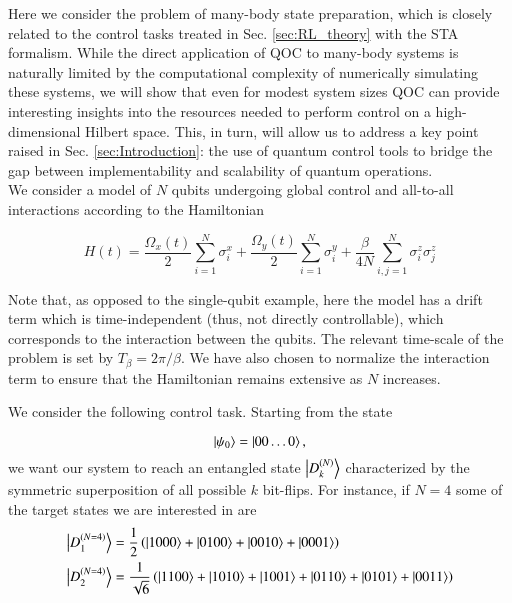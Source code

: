 Here we consider the problem of many-body state preparation, which is closely related to the control tasks treated in Sec. \ref{sec:RL_theory} with the STA formalism. While the direct application of QOC to many-body systems is naturally limited by the computational complexity of numerically simulating these systems, we will show that even for modest system sizes QOC can provide interesting insights into the resources needed to perform control on a high-dimensional Hilbert space. This, in turn, will allow us to address a key point raised in Sec. \ref{sec:Introduction}: the use of quantum control tools to bridge the gap between implementability and scalability of quantum operations. \\

We consider a model of $N$ qubits undergoing global control and all-to-all interactions according to the Hamiltonian

\begin{equation}
    H(t) = \frac{\Omega_x(t)}{2}\sum\limits_{i=1}^N \sigma_i^x + \frac{\Omega_y(t)}{2}\sum\limits_{i=1}^N \sigma_i^y + \frac{\beta}{4N}\sum\limits_{i,j=1}^N \sigma_i^z \sigma_j^z
    \label{eq:QOC_hami_many_body}
\end{equation}

Note that, as opposed to the single-qubit example, here the model has a drift term which is time-independent (thus, not directly controllable), which corresponds to the interaction between the qubits. The relevant time-scale of the problem is set by $T_\beta=2\pi/\beta$. We have also chosen to normalize the interaction term to ensure that the Hamiltonian remains extensive as $N$ increases. 

We consider the following control task. Starting from the state

\begin{equation}    \ket{\psi_0}=\ket{00\ldots 0},
\end{equation}
we want our system to reach an entangled state $\ket{D_k^{(N)}}$ characterized by the symmetric superposition of all possible $k$ bit-flips. For instance, if $N=4$ some of the target states we are interested in are 
\begin{align}
    \ket{D_1^{(N=4)}} &= \frac{1}{2}\left(\ket{1000}+\ket{0100}+\ket{0010}+\ket{0001}\right)\\
    \ket{D_2^{(N=4)}} &= \frac{1}{\sqrt{6}}\left(\ket{1100}+\ket{1010}+\ket{1001}+\ket{0110}+\ket{0101}+\ket{0011}\right)
\end{align}

